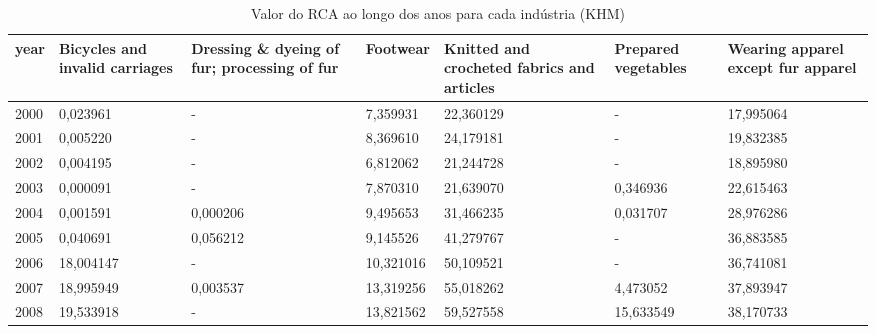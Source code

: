 \begin{table}
\centering
\caption{Valor do RCA ao longo dos anos para cada indústria (KHM)}
\begin{tabular}{p{1cm}p{2cm}p{2cm}p{2cm}p{2cm}p{2cm}p{2cm}}
\toprule
 year &  Bicycles and invalid carriages &  Dressing \& dyeing of fur; processing of fur &  Footwear &  Knitted and crocheted fabrics and articles &  Prepared vegetables &  Wearing apparel except fur apparel \\
\midrule
 2000 &                        0,023961 &                                            - &  7,359931 &                                   22,360129 &                    - &                           17,995064 \\
 2001 &                        0,005220 &                                            - &  8,369610 &                                   24,179181 &                    - &                           19,832385 \\
 2002 &                        0,004195 &                                            - &  6,812062 &                                   21,244728 &                    - &                           18,895980 \\
 2003 &                        0,000091 &                                            - &  7,870310 &                                   21,639070 &             0,346936 &                           22,615463 \\
 2004 &                        0,001591 &                                     0,000206 &  9,495653 &                                   31,466235 &             0,031707 &                           28,976286 \\
 2005 &                        0,040691 &                                     0,056212 &  9,145526 &                                   41,279767 &                    - &                           36,883585 \\
 2006 &                       18,004147 &                                            - & 10,321016 &                                   50,109521 &                    - &                           36,741081 \\
 2007 &                       18,995949 &                                     0,003537 & 13,319256 &                                   55,018262 &             4,473052 &                           37,893947 \\
 2008 &                       19,533918 &                                            - & 13,821562 &                                   59,527558 &            15,633549 &                           38,170733 \\

\end{tabular}
\end{table}
